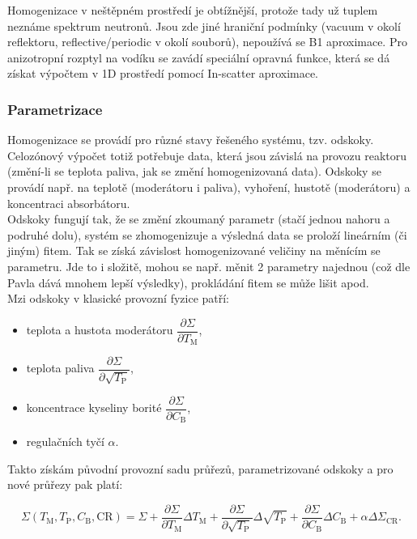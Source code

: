 Homogenizace v neštěpném prostředí je obtížnější, protože tady už tuplem neznáme spektrum neutronů. Jsou zde jiné hraniční podmínky (vacuum v okolí reflektoru, reflective/periodic v okolí souborů), nepoužívá se B1 aproximace. Pro anizotropní rozptyl na vodíku se zavádí speciální opravná funkce, která se dá získat výpočtem v 1D prostředí pomocí In-scatter aproximace.


\subsubsection{Parametrizace}

Homogenizace se provádí pro různé stavy řešeného systému, tzv. odskoky. Celozónový výpočet totiž potřebuje data, která jsou závislá na provozu reaktoru (změní-li se teplota paliva, jak se změní homogenizovaná data). Odskoky se provádí např. na teplotě (moderátoru i paliva), vyhoření, hustotě (moderátoru) a koncentraci absorbátoru.\\

Odskoky fungují tak, že se změní zkoumaný parametr (stačí jednou nahoru a podruhé dolu), systém se zhomogenizuje a výsledná data se proloží lineárním (či jiným) fitem. Tak se získá závislost homogenizované veličiny na měnícím se parametru. Jde to i složitě, mohou se např. měnit 2 parametry najednou (což dle Pavla dává mnohem lepší výsledky), prokládání fitem se může lišit apod.\\

Mzi odskoky v klasické provozní fyzice patří:

\begin{itemize}
  \item teplota a hustota moderátoru $\dfrac{\partial \Sigma}{\partial T_\text{M}}$,
  \item teplota paliva $\dfrac{\partial \Sigma}{\partial \sqrt{T_\text{P}}}$,
  \item koncentrace kyseliny borité $\dfrac{\partial \Sigma}{\partial C_\text{B}}$,
  \item regulačních tyčí $\alpha$.
\end{itemize}

Takto získám původní provozní sadu průřezů, parametrizované odskoky a pro nové průřezy pak platí:

\begin{equation}
  \boxed{
    \Sigma (T_\text{M}, T_\text{P}, C_\text{B}, \text{CR}) = \Sigma + \dfrac{\partial \Sigma}{\partial T_\text{M}} \Delta T_\text{M} + \dfrac{\partial \Sigma}{\partial \sqrt{T_\text{P}}} \Delta \sqrt{T_\text{P}} + \dfrac{\partial \Sigma}{\partial C_\text{B}} \Delta C_\text{B} + \alpha \Delta \Sigma_\text{CR}.}
\end{equation}

